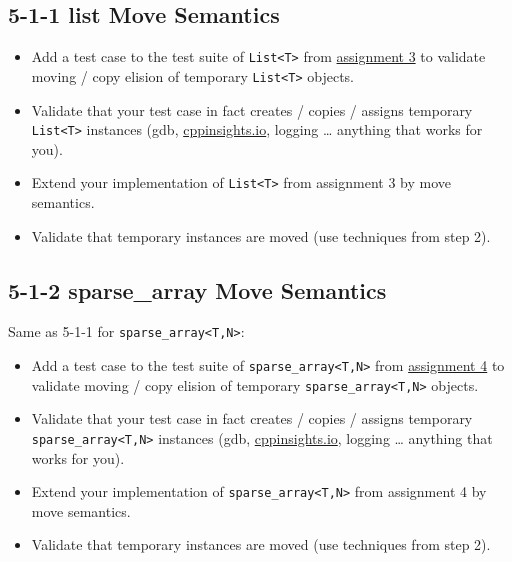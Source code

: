 \documentclass[]{article}
\providecommand{\tightlist}{%
  \setlength{\itemsep}{0pt}\setlength{\parskip}{0pt}}
\begin{document}
\subsection{5-1-1 list Move Semantics}\label{list-move-semantics}

\begin{itemize}
\tightlist
\item
  Add a test case to the test suite of
  \texttt{List\textless{}T\textgreater{}} from
  \href{/assignment-03/}{assignment 3} to validate moving / copy elision
  of temporary \texttt{List\textless{}T\textgreater{}} objects.
\item
  Validate that your test case in fact creates / copies / assigns
  temporary \texttt{List\textless{}T\textgreater{}} instances (gdb,
  \href{http://cppinsights.io}{cppinsights.io}, logging \ldots{}
  anything that works for you).
\item
  Extend your implementation of \texttt{List\textless{}T\textgreater{}}
  from assignment 3 by move semantics.
\item
  Validate that temporary instances are moved (use techniques from step
  2).
\end{itemize}

\subsection{5-1-2 sparse\_array Move
Semantics}\label{sparseux5farray-move-semantics}

Same as 5-1-1 for \texttt{sparse\_array\textless{}T,N\textgreater{}}:

\begin{itemize}
\tightlist
\item
  Add a test case to the test suite of
  \texttt{sparse\_array\textless{}T,N\textgreater{}} from
  \href{/assignment-04/}{assignment 4} to validate moving / copy elision
  of temporary \texttt{sparse\_array\textless{}T,N\textgreater{}}
  objects.
\item
  Validate that your test case in fact creates / copies / assigns
  temporary \texttt{sparse\_array\textless{}T,N\textgreater{}} instances
  (gdb, \href{http://cppinsights.io}{cppinsights.io}, logging \ldots{}
  anything that works for you).
\item
  Extend your implementation of
  \texttt{sparse\_array\textless{}T,N\textgreater{}} from assignment 4
  by move semantics.
\item
  Validate that temporary instances are moved (use techniques from step
  2).
\end{itemize}
\end{document}
